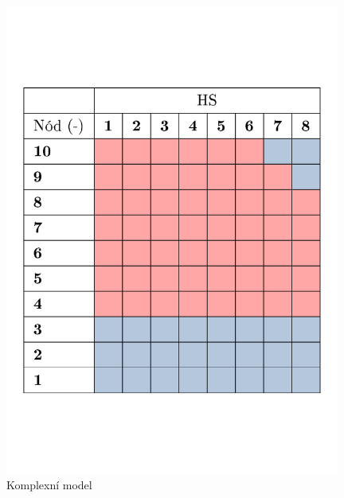 \begin{figure}[H]
	\centering
	\begin{minipage}{.5\textwidth}
		\centering
		\includegraphics[width=0.98\textwidth, trim={0.5cm 4cm 0cm 5cm}, clip]{./04_TH_model_IRT/grafy/var_serpent_komplex.pdf}
		\caption{Komplexní model}
		\label{fig:var_komplex_serpent}
	\end{minipage}%
	\begin{minipage}{.5\textwidth}
		\centering

\end{minipage}
\end{figure}
